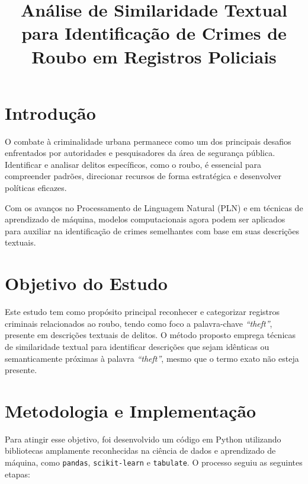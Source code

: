 \documentclass[12pt]{article}
\title{Análise de Similaridade Textual para Identificação de Crimes de Roubo em Registros Policiais}
\author{}
\date{}
\begin{document}
\maketitle

\section{Introdução}

O combate à criminalidade urbana permanece como um dos principais desafios enfrentados por autoridades e pesquisadores da área de segurança pública. Identificar e analisar delitos específicos, como o roubo, é essencial para compreender padrões, direcionar recursos de forma estratégica e desenvolver políticas eficazes. 

Com os avanços no Processamento de Linguagem Natural (PLN) e em técnicas de aprendizado de máquina, modelos computacionais agora podem ser aplicados para auxiliar na identificação de crimes semelhantes com base em suas descrições textuais.

\section{Objetivo do Estudo}

Este estudo tem como propósito principal reconhecer e categorizar registros criminais relacionados ao roubo, tendo como foco a palavra-chave \textit{``theft''}, presente em descrições textuais de delitos. O método proposto emprega técnicas de similaridade textual para identificar descrições que sejam idênticas ou semanticamente próximas à palavra \textit{``theft''}, mesmo que o termo exato não esteja presente.

\section{Metodologia e Implementação}

Para atingir esse objetivo, foi desenvolvido um código em Python utilizando bibliotecas amplamente reconhecidas na ciência de dados e aprendizado de máquina, como \texttt{pandas}, \texttt{scikit-learn} e \texttt{tabulate}. O processo seguiu as seguintes etapas:
\end{document}
